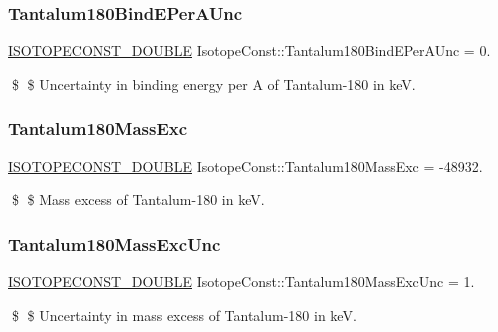 \subsubsection{\texorpdfstring{Tantalum180\+Bind\+E\+Per\+A\+Unc}{Tantalum180BindEPerAUnc}}
{\footnotesize\ttfamily \mbox{\hyperlink{group___isotope_const-_macros_ga8f45a7272ce02c0b4c65c44636ed719a}{I\+S\+O\+T\+O\+P\+E\+C\+O\+N\+S\+T\+\_\+\+D\+O\+U\+B\+LE}} Isotope\+Const\+::\+Tantalum180\+Bind\+E\+Per\+A\+Unc = 0.}

\$ \$ Uncertainty in binding energy per A of Tantalum-\/180 in keV. \mbox{\label{group___isotope_const-_tantalum-_ta180_gab57c84b597c115a8e64bcfccd1bd3aa3}} 
\subsubsection{\texorpdfstring{Tantalum180\+Mass\+Exc}{Tantalum180MassExc}}
{\footnotesize\ttfamily \mbox{\hyperlink{group___isotope_const-_macros_ga8f45a7272ce02c0b4c65c44636ed719a}{I\+S\+O\+T\+O\+P\+E\+C\+O\+N\+S\+T\+\_\+\+D\+O\+U\+B\+LE}} Isotope\+Const\+::\+Tantalum180\+Mass\+Exc = -\/48932.}

\$ \$ Mass excess of Tantalum-\/180 in keV. \mbox{\label{group___isotope_const-_tantalum-_ta180_ga0355e86660de7e5ef1f5ca3a1d962019}} 
\subsubsection{\texorpdfstring{Tantalum180\+Mass\+Exc\+Unc}{Tantalum180MassExcUnc}}
{\footnotesize\ttfamily \mbox{\hyperlink{group___isotope_const-_macros_ga8f45a7272ce02c0b4c65c44636ed719a}{I\+S\+O\+T\+O\+P\+E\+C\+O\+N\+S\+T\+\_\+\+D\+O\+U\+B\+LE}} Isotope\+Const\+::\+Tantalum180\+Mass\+Exc\+Unc = 1.}

\$ \$ Uncertainty in mass excess of Tantalum-\/180 in keV. \mbox{\label{group___isotope_const-_tantalum-_ta180_ga5e7df01f95c5e35719d1a4222a853c98}} 
